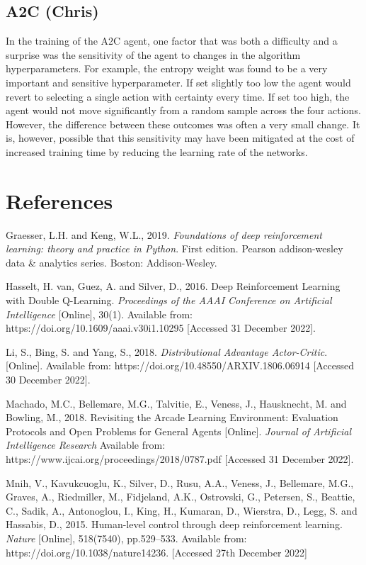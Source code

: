 \documentclass{article}
\begin{document}
\subsection{A2C (Chris)}

In the training of the A2C agent, one factor that was both a difficulty and a surprise was the sensitivity of the agent to changes in the algorithm hyperparameters. For example, the entropy weight was found to be a very important and sensitive hyperparameter. If set slightly too low the agent would revert to selecting a single action with certainty every time. If set too high, the agent would not move significantly from a random sample across the four actions. However, the difference between these outcomes was often a very small change. It is, however, possible that this sensitivity may have been mitigated at the cost of increased training time by reducing the learning rate of the networks.

\section*{References}

Graesser, L.H. and Keng, W.L., 2019. \emph{Foundations of deep reinforcement learning: theory and practice in Python}. First edition. Pearson addison-wesley data \& analytics series. Boston: Addison-Wesley.

Hasselt, H. van, Guez, A. and Silver, D., 2016. Deep Reinforcement Learning with Double Q-Learning. \emph{Proceedings of the AAAI Conference on Artificial Intelligence} [Online], 30(1). Available from: https://doi.org/10.1609/aaai.v30i1.10295 [Accessed 31 December 2022].

Li, S., Bing, S. and Yang, S., 2018. \emph{Distributional Advantage Actor-Critic}. [Online]. Available from: https://doi.org/10.48550/ARXIV.1806.06914 [Accessed 30 December 2022].

Machado, M.C., Bellemare, M.G., Talvitie, E., Veness, J., Hausknecht, M. and Bowling, M., 2018. Revisiting the Arcade Learning Environment: Evaluation Protocols and Open Problems for General Agents [Online]. \emph{Journal of Artificial Intelligence Research}  Available from: https://www.ijcai.org/proceedings/2018/0787.pdf  [Accessed 31 December 2022].

Mnih, V., Kavukcuoglu, K., Silver, D., Rusu, A.A., Veness, J., Bellemare, M.G., Graves, A., Riedmiller, M., Fidjeland, A.K., Ostrovski, G., Petersen, S., Beattie, C., Sadik, A., Antonoglou, I., King, H., Kumaran, D., Wierstra, D., Legg, S. and Hassabis, D., 2015. Human-level control through deep reinforcement learning. \emph{Nature} [Online], 518(7540), pp.529–533. Available from: https://doi.org/10.1038/nature14236. [Accessed 27th December 2022]
\end{document}
